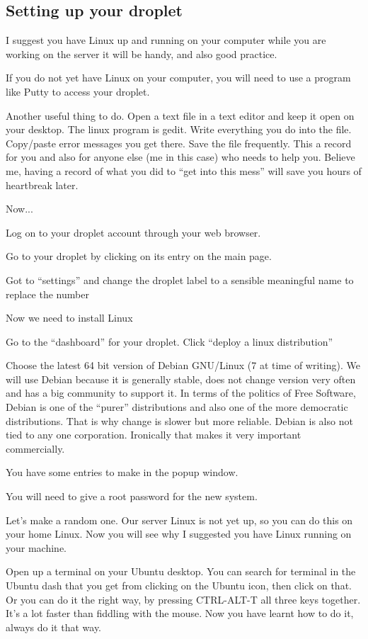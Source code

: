 \documentclass[12pt,a4paper]{article}
\begin{document}
\subsection*{Setting up your droplet}


I suggest you have Linux up and running on your computer while you are working on the server  it will be handy, and also good practice.

If you do not yet have Linux on your computer, you will need to use a program like Putty to access your droplet.

Another useful thing to do. Open a text file in a text editor and keep it open on your desktop. The linux program is gedit. Write everything you do into the file. Copy/paste error messages you get there. Save the file frequently. This a record for you and also for anyone else (me in this case) who needs to help you. Believe me, having a record of what you did to “get into this mess” will save you hours of heartbreak later. 

Now...

Log on to your droplet account through your web browser.

Go to your droplet by clicking on its entry on the main page.

Got to “settings” and change the droplet label to a sensible meaningful name to replace the number

Now we need to install Linux 

Go to the “dashboard” for your droplet. Click “deploy a linux distribution”

Choose the latest 64 bit version of Debian GNU/Linux (7 at time of writing). We will use Debian because it is generally stable, does not change version very often and has a big community to support it.  In terms of the politics of Free Software, Debian is one of the “purer” distributions and also one of the more democratic distributions. That is why change is slower but more reliable. Debian is also not tied to any one corporation. Ironically that makes it very important commercially.

You have some entries to make in the popup window.

You will need to give a root password for the new system. 

Let’s make a random one. Our server Linux is not yet up, so you can do this on your home Linux. Now you will see why I suggested you have Linux running on your machine.

Open up a terminal on your Ubuntu desktop. You can search for terminal in the Ubuntu dash that you get from clicking on the Ubuntu icon, then click on that. Or you can do it the right way, by pressing CTRL-ALT-T all three keys together. It’s a lot faster than fiddling with the mouse. Now you have learnt how to do it, always do it that way.  
\end{document}
